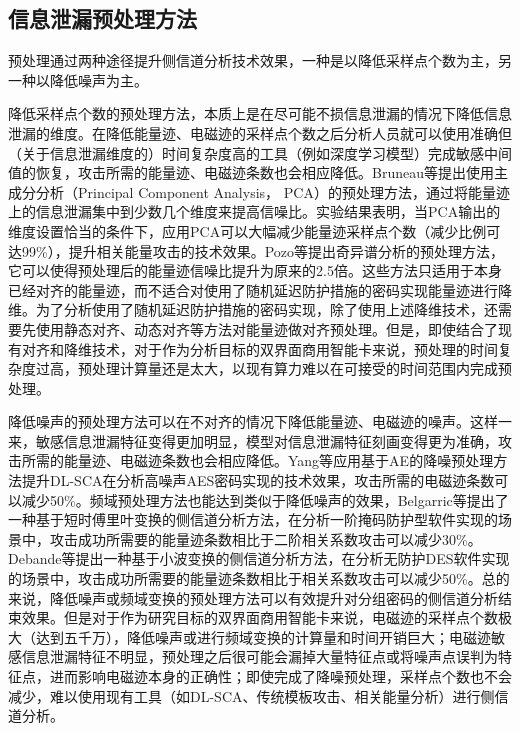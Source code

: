 {	\subsection{信息泄漏预处理方法}
	预处理通过两种途径提升侧信道分析技术效果，一种是以降低采样点个数为主，另一种以降低噪声为主。
	
	降低采样点个数的预处理方法，本质上是在尽可能不损信息泄漏的情况下降低信息泄漏的维度。在降低能量迹、电磁迹的采样点个数之后分析人员就可以使用准确但（关于信息泄漏维度的）时间复杂度高的工具（例如深度学习模型）完成敏感中间值的恢复，攻击所需的能量迹、电磁迹条数也会相应降低。Bruneau等\citep{bruneau:hal-01218072}提出使用主成分分析（Principal Component Analysis， PCA）的预处理方法，通过将能量迹上的信息泄漏集中到少数几个维度来提高信噪比。实验结果表明，当PCA输出的维度设置恰当的条件下，应用PCA可以大幅减少能量迹采样点个数（减少比例可达99\%），提升相关能量攻击的技术效果。Pozo等\citep{Pozo15}提出奇异谱分析的预处理方法，它可以使得预处理后的能量迹信噪比提升为原来的2.5倍。这些方法只适用于本身已经对齐的能量迹，而不适合对使用了随机延迟防护措施的密码实现能量迹进行降维。为了分析使用了随机延迟防护措施的密码实现，除了使用上述降维技术，还需要先使用静态对齐\citep{Homma08}、动态对齐\citep{Woudenberg11}等方法对能量迹做对齐预处理。但是，即使结合了现有对齐和降维技术，对于作为分析目标的双界面商用智能卡来说，预处理的时间复杂度过高，预处理计算量还是太大，以现有算力难以在可接受的时间范围内完成预处理。
	
	降低噪声的预处理方法可以在不对齐的情况下降低能量迹、电磁迹的噪声。这样一来，敏感信息泄漏特征变得更加明显，模型对信息泄漏特征刻画变得更为准确，攻击所需的能量迹、电磁迹条数也会相应降低。Yang等\citep{Yang19}应用基于AE的降噪预处理方法提升DL-SCA在分析高噪声AES密码实现的技术效果，攻击所需的电磁迹条数可以减少50\%。频域预处理方法也能达到类似于降低噪声的效果，Belgarric等\citep{Belgarric16}提出了一种基于短时傅里叶变换的侧信道分析方法，在分析一阶掩码防护型软件实现的场景中，攻击成功所需要的能量迹条数相比于二阶相关系数攻击可以减少30\%。Debande等\citep{Debande12}提出一种基于小波变换的侧信道分析方法，在分析无防护DES软件实现的场景中，攻击成功所需要的能量迹条数相比于相关系数攻击可以减少50\%。总的来说，降低噪声或频域变换的预处理方法可以有效提升对分组密码的侧信道分析结束效果。但是对于作为研究目标的双界面商用智能卡来说，电磁迹的采样点个数极大（达到五千万），降低噪声或进行频域变换的计算量和时间开销巨大；电磁迹敏感信息泄漏特征不明显，预处理之后很可能会漏掉大量特征点或将噪声点误判为特征点，进而影响电磁迹本身的正确性；即使完成了降噪预处理，采样点个数也不会减少，难以使用现有工具（如DL-SCA、传统模板攻击、相关能量分析）进行侧信道分析。
	
}

